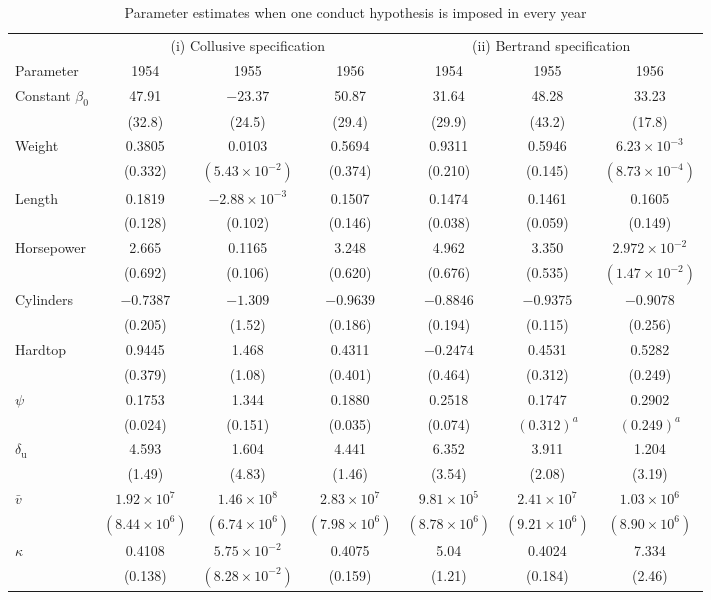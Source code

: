 \begin{table}[t]
\centering
\caption{Parameter estimates when one conduct hypothesis is imposed in every year}
\label{tab:06-bres-v}
\footnotesize
\setlength{\tabcolsep}{4pt}
\begin{tabular}{@{}lcccccc@{}}
\toprule
 & \multicolumn{3}{c}{(i) Collusive specification} & \multicolumn{3}{c}{(ii) Bertrand specification} \\
\cmidrule(lr){2-4}\cmidrule(l){5-7}
Parameter & 1954 & 1955 & 1956 & 1954 & 1955 & 1956 \\
\midrule
Constant $\beta_0$ & 47.91 & $-23.37$ & 50.87 & 31.64 & 48.28 & 33.23 \\
  & (32.8) & (24.5) & (29.4) & (29.9) & (43.2) & (17.8) \\
Weight & 0.3805 & 0.0103 & 0.5694 & 0.9311 & 0.5946 & $6.23\times10^{-3}$ \\
  & (0.332) & $(5.43\times10^{-2})$ & (0.374) & (0.210) & (0.145) & $(8.73\times10^{-4})$ \\
Length & 0.1819 & $-2.88\times10^{-3}$ & 0.1507 & 0.1474 & 0.1461 & 0.1605 \\
  & (0.128) & (0.102) & (0.146) & (0.038) & (0.059) & (0.149) \\
Horsepower & 2.665 & 0.1165 & 3.248 & 4.962 & 3.350 & $2.972\times10^{-2}$ \\
  & (0.692) & (0.106) & (0.620) & (0.676) & (0.535) & $(1.47\times10^{-2})$ \\
Cylinders & $-0.7387$ & $-1.309$ & $-0.9639$ & $-0.8846$ & $-0.9375$ & $-0.9078$ \\
  & (0.205) & (1.52) & (0.186) & (0.194) & (0.115) & (0.256) \\
Hardtop & 0.9445 & 1.468 & 0.4311 & $-0.2474$ & 0.4531 & 0.5282 \\
  & (0.379) & (1.08) & (0.401) & (0.464) & (0.312) & (0.249) \\
$\psi$ & 0.1753 & 1.344 & 0.1880 & 0.2518 & 0.1747 & 0.2902 \\
  & (0.024) & (0.151) & (0.035) & (0.074) & $(0.312)^{a}$ & $(0.249)^{a}$ \\
$\delta_{\mathrm u}$ & 4.593 & 1.604 & 4.441 & 6.352 & 3.911 & 1.204 \\
  & (1.49) & (4.83) & (1.46) & (3.54) & (2.08) & (3.19) \\
$\bar v$ & $1.92\times10^{7}$ & $1.46\times10^{8}$ & $2.83\times10^{7}$ & $9.81\times10^{5}$ & $2.41\times10^{7}$ & $1.03\times10^{6}$ \\
  & $(8.44\times10^{6})$ & $(6.74\times10^{6})$ & $(7.98\times10^{6})$ & $(8.78\times10^{6})$ & $(9.21\times10^{6})$ & $(8.90\times10^{6})$ \\
$\kappa$ & 0.4108 & $5.75\times10^{-2}$ & 0.4075 & 5.04 & 0.4024 & 7.334 \\
  & (0.138) & $(8.28\times10^{-2})$ & (0.159) & (1.21) & (0.184) & (2.46) \\
\bottomrule
\end{tabular}


\end{table}
